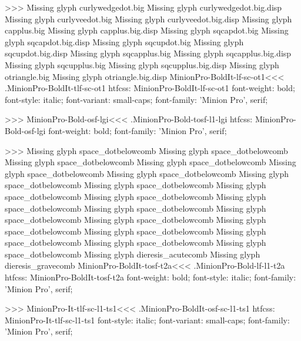 {>>>
Missing glyph	curlywedgedot.big
Missing glyph	curlywedgedot.big.disp
Missing glyph	curlyveedot.big
Missing glyph	curlyveedot.big.disp
Missing glyph	capplus.big
Missing glyph	capplus.big.disp
Missing glyph	sqcapdot.big
Missing glyph	sqcapdot.big.disp
Missing glyph	sqcupdot.big
Missing glyph	sqcupdot.big.disp
Missing glyph	sqcapplus.big
Missing glyph	sqcapplus.big.disp
Missing glyph	sqcupplus.big
Missing glyph	sqcupplus.big.disp
Missing glyph	otriangle.big
Missing glyph	otriangle.big.disp
\<MinionPro-BoldIt-lf-sc-ot1\><<<
.MinionPro-BoldIt-tlf-sc-ot1
htfcss:  MinionPro-BoldIt-lf-sc-ot1  font-weight: bold; font-style: italic; font-variant: small-caps; font-family: 'Minion Pro', serif;

>>>
\<MinionPro-Bold-osf-lgi\><<<
.MinionPro-Bold-tosf-l1-lgi
htfcss:  MinionPro-Bold-osf-lgi  font-weight: bold; font-family: 'Minion Pro', serif;

>>>
Missing glyph	space_dotbelowcomb
Missing glyph	space_dotbelowcomb
Missing glyph	space_dotbelowcomb
Missing glyph	space_dotbelowcomb
Missing glyph	space_dotbelowcomb
Missing glyph	space_dotbelowcomb
Missing glyph	space_dotbelowcomb
Missing glyph	space_dotbelowcomb
Missing glyph	space_dotbelowcomb
Missing glyph	space_dotbelowcomb
Missing glyph	space_dotbelowcomb
Missing glyph	space_dotbelowcomb
Missing glyph	space_dotbelowcomb
Missing glyph	space_dotbelowcomb
Missing glyph	space_dotbelowcomb
Missing glyph	space_dotbelowcomb
Missing glyph	space_dotbelowcomb
Missing glyph	space_dotbelowcomb
Missing glyph	space_dotbelowcomb
Missing glyph	dieresis_acutecomb
Missing glyph	dieresis_gravecomb
\<MinionPro-BoldIt-tosf-t2a\><<<
.MinionPro-Bold-lf-l1-t2a
htfcss:  MinionPro-BoldIt-tosf-t2a  font-weight: bold; font-style: italic; font-family: 'Minion Pro', serif;

>>>
\<MinionPro-It-tlf-sc-l1-ts1\><<<
.MinionPro-BoldIt-osf-sc-l1-ts1
htfcss:  MinionPro-It-tlf-sc-l1-ts1  font-style: italic; font-variant: small-caps; font-family: 'Minion Pro', serif;

}
